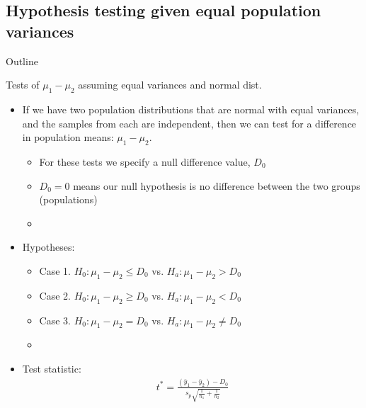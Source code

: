 \documentclass[xcolor=dvipsnames]{beamer}
\begin{document}
\subsection{Hypothesis testing given equal population variances}
\begin{frame}{Outline}
\tableofcontents[currentsection,subsectionstyle=show/shaded/hide]
\end{frame}

\begin{frame}{Tests of $\mu_1 - \mu_2$ assuming equal variances and normal dist.}
\begin{itemize}
	\item If we have two population distributions that are normal with equal variances, and the samples from each are independent, then we can test for a difference in population means: $\mu_1 - \mu_2$. 
	
	\begin{itemize}
		\item For these tests we specify a null difference value, $D_0$
		\item $D_0 = 0$ means our null hypothesis is no difference between the two groups (populations)
		\item[]
	\end{itemize}
	\item Hypotheses:
	\begin{itemize}
		\item Case 1. $H_0: \mu_1 - \mu_2 \leq D_0$ vs. $H_a: \mu_1 - \mu_2 > D_0$
		\item Case 2. $H_0: \mu_1 - \mu_2 \geq D_0$ vs. $H_a: \mu_1 - \mu_2 < D_0$
		\item Case 3. $H_0: \mu_1 - \mu_2 = D_0$ vs. $H_a: \mu_1 - \mu_2 \neq D_0$
		\item[]
	\end{itemize}
	\item Test statistic:
	\begin{align*}
	t^* = \frac{(\bar{y}_1-\bar{y}_2) - D_0}{s_p \sqrt{\frac{1}{n_1} + \frac{1}{n_2}}}
	\end{align*}
\end{itemize}
\end{frame}
\end{document}

